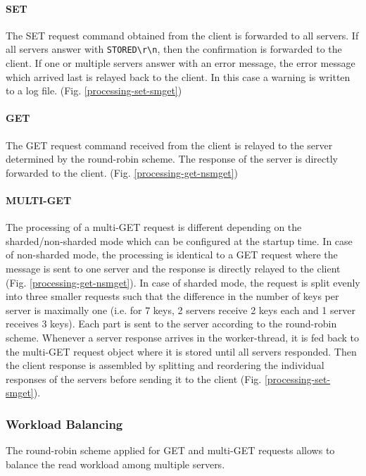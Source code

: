 \documentclass[report.tex]{subfiles}
\begin{document}
\paragraph{SET} The SET request command obtained from the client is forwarded to all servers. If all servers answer with \texttt{STORED\textbackslash r\textbackslash n}, then the confirmation is forwarded to the client. 
If one or multiple servers answer with an error message, the error message which arrived last is relayed back to the client. 
In this case a warning is written to a log file. (Fig. \ref{processing-set-smget})

\paragraph{GET} The GET request command received from the client is relayed to the server determined by the round-robin scheme.
The response of the server is directly forwarded to the client. (Fig. \ref{processing-get-nsmget})

\paragraph{MULTI-GET} The processing of a multi-GET request is different depending on the sharded/non-sharded mode which can be configured at the startup time. In case of non-sharded mode, the processing is identical to a GET request where the message is sent to one server and the response is directly relayed to the client (Fig. \ref{processing-get-nsmget}). In case of sharded mode, the request is split evenly into three smaller requests such that the difference in the number of keys per server is maximally one (i.e. for 7 keys, 2 servers receive 2 keys each and 1 server receives 3 keys).
Each part is sent to the server according to the round-robin scheme. Whenever a server response arrives in the worker-thread, it is fed back to the multi-GET request object where it is stored until all servers responded. Then the client response is assembled by splitting and reordering the individual responses of the servers before sending it to the client (Fig. \ref{processing-set-smget}).

\subsubsection{Workload Balancing}\label{workload-balancing}
The round-robin scheme applied for GET and multi-GET requests allows to balance the read workload among multiple servers.
\end{document}
